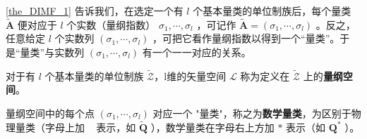
\begin{issues}
\issueTODO
\end{issues}

\autoref{the_DIMF_1} 告诉我们，在选定一个有 $l$ 个基本量类的单位制族后，每个量类 $\tilde{\boldsymbol{A}}$ 便对应于 $l$ 个实数（量纲指数） $\sigma_1,\cdots,\sigma_l$ ，可记作 $\tilde{\boldsymbol{A}}=(\sigma_1,\cdots,\sigma_l)$ 。反之，任意给定 $l$ 个实数列 $(\sigma_1,\cdots,\sigma_l)$ ，可把它看作量纲指数以得到一个“量类”。于是“量类”与实数列 $(\sigma_1,\cdots,\sigma_l)$ 有一个一一对应的关系。
\begin{definition}{}
对于有 $l$ 个基本量类的单位制族 $\tilde{\mathscr{Z}}$，l维的矢量空间 $\mathscr{L}$ 称为定义在 $\tilde{\mathscr{Z}}$ 上的\textbf{量纲空间}。
\end{definition}
量纲空间中的每个点 $(\sigma_1,\cdots,\sigma_l)$ 对应一个 "量类"，称之为\textbf{数学量类}，为区别于物理量类（字母上加 ~ 表示，如 $\tilde{\boldsymbol{Q}}$ ），数学量类在字母右上方加 $*$ 表示（如 $\boldsymbol{Q}^*$ ）。
